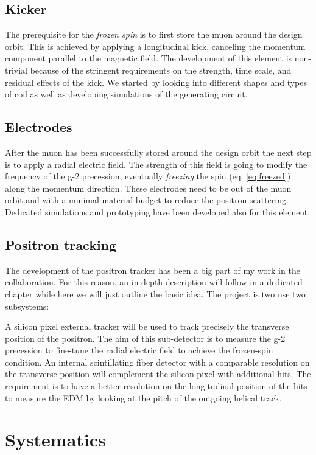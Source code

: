 \begin{refsection}
\subsection{Kicker}
The prerequisite for the \textit{frozen spin} is to first store the muon around the design orbit.
This is achieved by applying a longitudinal kick, canceling the momentum component parallel to the magnetic field.
The development of this element is non-trivial because of the stringent requirements on the strength, time scale, and residual effects of the kick.
We started by looking into different shapes and types of coil as well as developing \ltsp simulations of the generating circuit.

\subsection{Electrodes}
After the muon has been successfully stored around the design orbit the next step is to apply a radial electric field. 
The strength of this field is going to modify the frequency of the g-2 precession, eventually \textit{freezing} the spin (eq. \ref{eq:freezed}) along the momentum direction.
These electrodes need to be out of the muon orbit and with a minimal material budget to reduce the positron scattering.  
Dedicated simulations and prototyping have been developed also for this element.

\subsection{Positron tracking}
The development of the positron tracker has been a big part of my work in the collaboration.
For this reason, an in-depth description will follow in a dedicated chapter while here we will just outline the basic idea.
The project is two use two subsystems:
\begin{outline}
    \1 A silicon pixel external tracker will be used to track precisely the transverse position of the positron. The aim of this sub-detector is to measure the g-2 precession to fine-tune the radial electric field to achieve the frozen-spin condition.
    \1 An internal scintillating fiber detector with a comparable resolution on the transverse position will complement the silicon pixel with additional hits. The requirement is to have a better resolution on the longitudinal position of the hits to measure the EDM by looking at the pitch of the outgoing helical track.
\end{outline}

\section{Systematics}
\label{muEDM:systematics}


\cite{muEDM:Semertzidis:2001} \cite{muEDM:g-2:2008} \cite{muEDM:Adelmann:2010} \cite{muEDM:J-PARC:2011} \cite{muEDM:J-PARC:2016} \cite{muEDM:PSI:2021} \cite{muEDM:PSI:Mikio:2022} \cite{muEDM:PSI:Kim:2022}

\printbibliography[title=Bibliography on muEDM]
\end{refsection}
